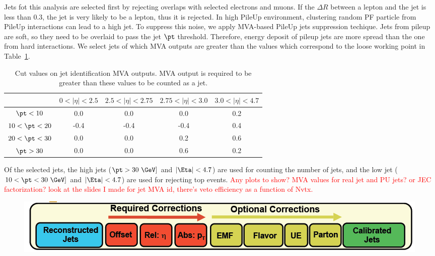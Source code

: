 Jets fot this analysis are selected first by rejecting overlaps with selected electrons 
and muons. If the $\Delta R$ between a lepton and the jet is less than 0.3, the jet 
is very likely to be a lepton, thus it is rejected. In high PileUp environment, 
clustering random PF particle from PileUp interactions can lead to a high \pt{} jet. 
To suppress this noise, we apply MVA-based PileUp jets suppression techique. 
Jets from pileup are soft, so they need to be overlaid to pass the jet $\pt$ threshold. 
Therefore, energy deposit of pileup jets are more spread than the one from hard interactions.
We select jets of which MVA outputs are greater than the values 
which correspond to the loose working point in Table~\ref{tab:jetidcut}.
\begin{table}[htp]
	\centering
		\begin{tabular}{c|c|c|c|c}
			\hline
									&  $0<|\eta|<2.5$ 	& $2.5<|\eta|<2.75$		& $2.75<|\eta|<3.0$ 	& $3.0<|\eta|<4.7$ 		\\ 
			\hline \hline
				$\pt<10$ \GeV		& 0.0 				& 0.0					& 0.0	 				& 0.2					\\ 
				$10<\pt<20$	\GeV 	& -0.4 				& -0.4					& -0.4	 				& 0.4					\\
				$20<\pt<30$	\GeV	& 0.0 				& 0.0					& 0.2	 				& 0.6					\\ 
				$\pt>30$ \GeV 		& 0.0 				& 0.0					& 0.6	 				& 0.2					\\
			\hline 
		\end{tabular}
		\caption{Cut values on jet identification MVA outputs. MVA output is required to be greater than 
				these values to be counted as a jet.}
	\label{tab:jetidcut}
\end{table}
Of the selected jets, the high \pt{} jets ($\pt>30~\GeV]$ and $|\Eta|<4.7$) are used for counting 
the number of jets, and the low \pt{} jet ($10<\pt<30~\GeV]$ and $|\Eta|<4.7$) are used 
for rejecting top events. 
\textcolor{red}{Any plots to show? MVA values for real jet and PU jets? or JEC factorization? 
look at the slides I made for jet MVA id, there's veto efficiency as a function of Nvtx.} 
\begin{figure}[!hbtp]
\includegraphics[width=.99\textwidth]{figures/jecfactoriztiontmp.png}
\end{figure}


